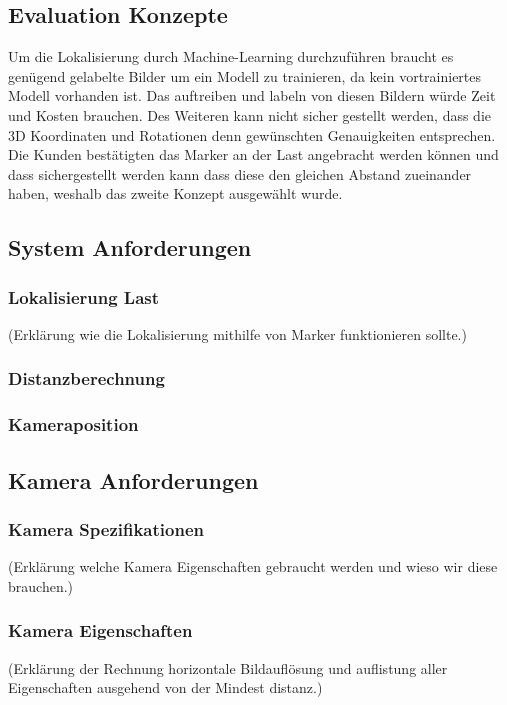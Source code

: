 \subsection{Evaluation Konzepte}
Um die Lokalisierung durch Machine-Learning durchzuführen braucht es genügend gelabelte Bilder um ein Modell zu trainieren, da kein vortrainiertes Modell vorhanden ist. Das auftreiben und labeln von diesen Bildern würde Zeit und Kosten brauchen. Des Weiteren kann nicht sicher gestellt werden, dass die 3D Koordinaten und Rotationen denn gewünschten Genauigkeiten entsprechen. Die Kunden bestätigten das Marker an der Last angebracht werden können und dass sichergestellt werden kann dass diese den gleichen Abstand zueinander haben, weshalb das zweite Konzept ausgewählt wurde.


\subsection{System Anforderungen}

\subsubsection{Lokalisierung Last}
(Erklärung wie die Lokalisierung mithilfe von Marker funktionieren sollte.)


\subsubsection{Distanzberechnung}
\subsubsection{Kameraposition}

\subsection{Kamera Anforderungen}
\subsubsection{Kamera Spezifikationen}
(Erklärung welche Kamera Eigenschaften gebraucht werden und wieso wir diese brauchen.)

\subsubsection{Kamera Eigenschaften}
(Erklärung der Rechnung horizontale Bildauflösung und auflistung aller Eigenschaften ausgehend von der Mindest distanz.)



